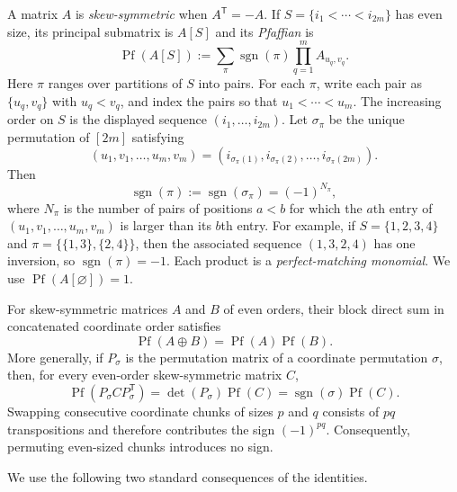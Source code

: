 \documentclass[11pt]{article}
\theoremstyle{definition}
\theoremstyle{remark}
\newcommand{\Pf}{\operatorname{Pf}}
\newcommand{\trans}{\mathsf T}
\newcommand{\sgn}{\operatorname{sgn}}
\begin{document}
A matrix $A$ is \emph{skew-symmetric} when $A^{\trans}=-A$.  If
$S=\{i_1<\cdots<i_{2m}\}$ has even size, its principal submatrix is $A[S]$
and its \emph{Pfaffian} is
\begin{equation}
  \Pf(A[S])
  :=\sum_{\pi}\sgn(\pi)
       \prod_{q=1}^{m}A_{u_q,v_q}.
  \label{eq:pfaffian-definition}
\end{equation}
Here $\pi$ ranges over partitions of $S$ into pairs.  For each $\pi$, write
each pair as $\{u_q,v_q\}$ with $u_q<v_q$, and index the pairs so that
$u_1<\cdots<u_m$.  The increasing order on $S$ is the displayed sequence
$(i_1,\ldots,i_{2m})$.  Let $\sigma_\pi$ be the unique permutation of
$[2m]$ satisfying
\[
  (u_1,v_1,\ldots,u_m,v_m)
  =(i_{\sigma_\pi(1)},i_{\sigma_\pi(2)},\ldots,i_{\sigma_\pi(2m)}).
\]
Then
\[
  \sgn(\pi):=\sgn(\sigma_\pi)=(-1)^{N_\pi},
\]
where $N_\pi$ is the number of pairs of positions $a<b$ for which the
$a$th entry of $(u_1,v_1,\ldots,u_m,v_m)$ is larger than its $b$th entry.
For example, if $S=\{1,2,3,4\}$ and
$\pi=\{\{1,3\},\{2,4\}\}$, then the associated sequence
$(1,3,2,4)$ has one inversion, so $\sgn(\pi)=-1$.  Each product is a
\emph{perfect-matching monomial}.  We use $\Pf(A[\varnothing])=1$.

For skew-symmetric matrices $A$ and $B$ of even orders, their block direct
sum in concatenated coordinate order satisfies
\[
  \Pf(A\oplus B)=\Pf(A)\Pf(B).
\]
More generally, if $P_\sigma$ is the permutation matrix of a coordinate
permutation $\sigma$, then, for every even-order skew-symmetric matrix $C$,
\[
  \Pf(P_\sigma C P_\sigma^{\trans})
  =\det(P_\sigma)\Pf(C)
  =\sgn(\sigma)\Pf(C).
\]
Swapping consecutive coordinate chunks of sizes $p$ and $q$ consists of
$pq$ transpositions and therefore contributes the sign $(-1)^{pq}$.
Consequently, permuting even-sized chunks introduces no sign.

We use the following two standard consequences of the identities.
\end{document}
